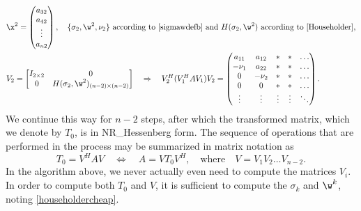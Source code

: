 \begin{align*}
    &\x^{2}=\begin{pmatrix} a_{32} \\ a_{42} \\ \vdots \\ a_{n2} \end{pmatrix}, \quad
    \textrm{$\{\sigma_{2},\w^{2},\nu_{2}\}$ according to \eqref{sigmawdefb} and $H(\sigma_{2},\w^{2})$
    according to \eqref{Householder},}\\
    &V_{2}=\begin{bmatrix} I_{2\times 2} & 0 \\ 0 & H(\sigma_{2},\w^{2})_{(n-2)\times (n-2)} \end{bmatrix}
    \quad \Rightarrow \quad
    V_{2}^{H}(V_{1}^{H}A V_{1})V_{2}=\begin{pmatrix} a_{11} & a_{12} & * & * & \hdots \\
				      -\nu_{1}   & a_{22} & * & * & \hdots \\
				      0          & -\nu_{2} & * & * & \hdots \\
				      0          & 0 & * & * & \hdots \\
				      \vdots     & \vdots & \vdots & \vdots & \ddots \end{pmatrix}.
\end{align*}
We continue this way for $n-2$ steps, after which the transformed
matrix, which we denote by $T_0$, is in NR_Hessenberg form.  The
sequence of operations that are performed in the process may be
summarized in matrix notation as
\begin{equation*}
    T_0=V^{H} A V \quad \Leftrightarrow \quad A=V T_0 V^{H}, \quad
    \textrm{where} \quad V=V_{1}V_{2}\hdots V_{n-2}.
\end{equation*}
In the algorithm above, we never actually even need to compute the
matrices $V_{i}$.  In order to compute both $T_0$ and $V$, it is
sufficient to compute the $\sigma_{k}$ and $\w^{k}$, noting
\eqref{householdercheap}.

